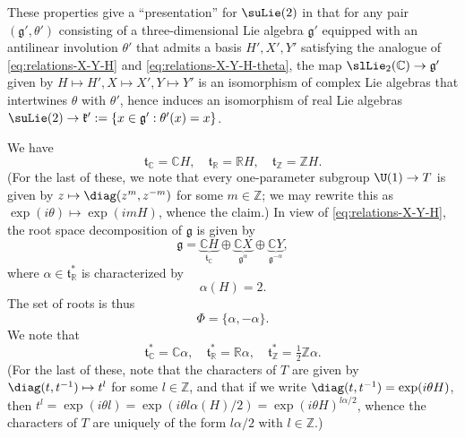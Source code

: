 \documentclass[reqno]{amsart} 
\begin{document}
These properties give a ``presentation'' for $\suLie(2)$ in that for any pair $(\mathfrak{g} ', \theta')$ consisting of a three-dimensional Lie algebra $\mathfrak{g} '$ equipped with an antilinear involution $\theta'$ that admits a basis $H', X', Y'$ satisfying the analogue of \eqref{eq:relations-X-Y-H} and \eqref{eq:relations-X-Y-H-theta}, the map $\slLie_2(\mathbb{C}) \rightarrow \mathfrak{g} '$ given by $H \mapsto H', X \mapsto X', Y \mapsto Y'$ is an isomorphism of complex Lie algebras that intertwines $\theta$ with $\theta '$, hence induces an isomorphism of real Lie algebras $\suLie(2) \rightarrow \mathfrak{k} ' := \{x \in \mathfrak{g} ' : \theta '(x) = x\}$.

We have
\begin{equation*}
  \mathfrak{t}_{\mathbb{C}} = \mathbb{C} H, \quad \mathfrak{t}_{\mathbb{R}} = \mathbb{R} H, \quad \mathfrak{t}_{\mathbb{Z}} = \mathbb{Z} H.
\end{equation*}
(For the last of these, we note that every one-parameter subgroup $\U(1) \rightarrow T$ is given by $z \mapsto \diag(z^m, z^{-m})$ for some $m \in \mathbb{Z}$; we may rewrite this as $\exp(i \theta) \mapsto \exp(i m H)$, whence the claim.)  In view of \eqref{eq:relations-X-Y-H}, the root space decomposition of $\mathfrak{g}$ is given by
\begin{equation*}
  \mathfrak{g} =
  \underbrace{\mathbb{C} H}_{\mathfrak{t}_{\mathbb{C}}}
  \oplus
  \underbrace{\mathbb{C} X}_{\mathfrak{g}^{\alpha}}
  \oplus
  \underbrace{\mathbb{C} Y}_{\mathfrak{g}^{-\alpha}},
\end{equation*}
where $\alpha \in \mathfrak{t} _{\mathbb{R} }^*$ is characterized by
\begin{equation*}
  \alpha(H) = 2.
\end{equation*}
The set of roots is thus
\begin{equation*}
  \Phi = \{\alpha, - \alpha\}.
\end{equation*}
We note that
\begin{equation*}
  \mathfrak{t}_{\mathbb{C}}^* = \mathbb{C} \alpha,
  \quad
  \mathfrak{t}_{\mathbb{R}}^* = \mathbb{R} \alpha,
  \quad
  \mathfrak{t}_{\mathbb{Z}}^*
  =  \tfrac{1}{2}\mathbb{Z} \alpha.
\end{equation*}
(For the last of these, note that the characters of $T$ are given by $\diag(t,t^{-1}) \mapsto t^{l}$ for some $l \in \mathbb{Z}$, and that if we write $\diag(t,t^{-1}) = \exp(i \theta H)$, then $t^l = \exp(i \theta l) = \exp(i \theta l \alpha(H)/2) = \exp(i \theta H)^{l \alpha/2}$, whence the characters of $T$ are uniquely of the form $l \alpha/2$ with $l \in \mathbb{Z}$.)
\end{document}
